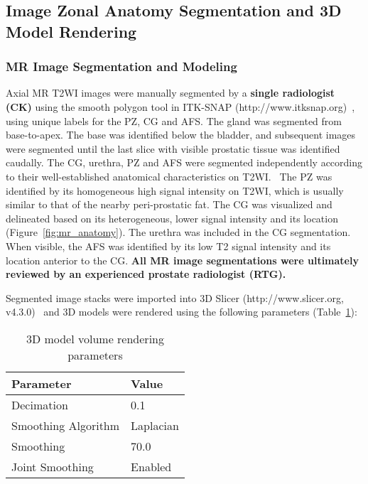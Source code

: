 \subsection{Image Zonal Anatomy Segmentation and 3D Model Rendering}
\subsubsection{MR Image Segmentation and Modeling}
Axial MR T2WI images were manually segmented by a \textbf{single radiologist
    (CK)} using the smooth polygon tool in ITK-SNAP
(http://www.itksnap.org)~\cite{Yushkevich2006}, using unique labels for the PZ,
CG and AFS. The gland was segmented from base-to-apex.  The base was identified
below the bladder, and subsequent images were segmented until the last slice
with visible prostatic tissue was identified caudally. The CG, urethra, PZ and
AFS were segmented independently according to their well-established anatomical
characteristics on
T2WI.~\cite{Barentsz2012,Jung2012,Poon1985,Hricak2007,Bonekamp2011} The PZ was
identified by its homogeneous high signal intensity on T2WI, which is usually
similar to that of the nearby peri-prostatic fat. The CG was visualized and
delineated based on its heterogeneous, lower signal intensity and its location
(Figure~\ref{fig:mr_anatomy}). The urethra was included in the CG segmentation.
When visible, the AFS was identified by its low T2 signal intensity and its
location anterior to the CG.  \textbf{All MR image segmentations were
    ultimately reviewed by an experienced prostate radiologist (RTG).}



Segmented image stacks were imported into 3D Slicer (http://www.slicer.org, v4.3.0)~\cite{Fedorov2012} and 3D
models were rendered using the following parameters (Table~\ref{tab:3dslicer}):

\begin{table}[h!]
\centering
\caption{3D model volume rendering parameters}
\begin{tabular}{ll}
{\bf Parameter} & {\bf Value} \\ \hline
Decimation & 0.1 \\
Smoothing Algorithm & Laplacian \\
Smoothing  & 70.0 \\
Joint Smoothing & Enabled \\
\end{tabular}
\label{tab:3dslicer}
\end{table}

